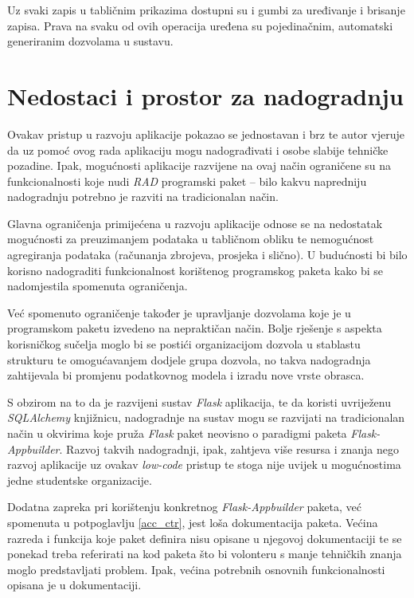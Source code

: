 \documentclass[times, utf8, diplomski]{fer}
\begin{document}
Uz svaki zapis u tabličnim prikazima dostupni su i gumbi za uređivanje i
brisanje zapisa. Prava na svaku od ovih operacija uređena su pojedinačnim,
automatski generiranim dozvolama u sustavu.

\section{Nedostaci i prostor za nadogradnju}

Ovakav pristup u razvoju aplikacije pokazao se jednostavan i brz te autor
vjeruje da uz pomoć ovog rada aplikaciju mogu nadograđivati i osobe slabije
tehničke pozadine. Ipak, mogućnosti aplikacije razvijene na ovaj način
ograničene su na funkcionalnosti koje nudi \emph{RAD} programski paket -- bilo
kakvu napredniju nadogradnju potrebno je razviti na tradicionalan način.

Glavna ograničenja primijećena u razvoju aplikacije odnose se na nedostatak
mogućnosti za preuzimanjem podataka u tabličnom obliku te nemogućnost
agregiranja podataka (računanja zbrojeva, prosjeka i slično). U budućnosti bi
bilo korisno nadograditi funkcionalnost korištenog programskog paketa kako bi se
nadomjestila spomenuta ograničenja.

Već spomenuto ograničenje također je upravljanje dozvolama koje je u programskom
paketu izvedeno na nepraktičan način. Bolje rješenje s aspekta korisničkog
sučelja moglo bi se postići organizacijom dozvola u stablastu strukturu te
omogućavanjem dodjele grupa dozvola, no takva nadogradnja zahtijevala bi promjenu
podatkovnog modela i izradu nove vrste obrasca.

S obzirom na to da je razvijeni sustav \emph{Flask} aplikacija, te da koristi
uvriježenu \emph{SQLAlchemy} knjižnicu, nadogradnje na sustav mogu se razvijati
na tradicionalan način u okvirima koje pruža \emph{Flask} paket neovisno o
paradigmi paketa \emph{Flask-Appbuilder}. Razvoj takvih nadogradnji, ipak,
zahtjeva više resursa i znanja nego razvoj aplikacije uz ovakav \emph{low-code}
pristup te stoga nije uvijek u mogućnostima jedne studentske organizacije.

Dodatna zapreka pri korištenju konkretnog \emph{Flask-Appbuilder} paketa, već
spomenuta u potpoglavlju \ref{acc_ctr}, jest loša dokumentacija paketa. Većina
razreda i funkcija koje paket definira nisu opisane u njegovoj dokumentaciji te
se ponekad treba referirati na kod paketa što bi volonteru s manje tehničkih
znanja moglo predstavljati problem. Ipak, većina potrebnih osnovnih
funkcionalnosti opisana je u dokumentaciji.
\end{document}
